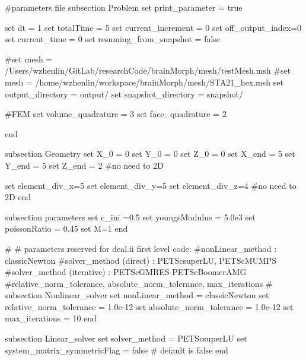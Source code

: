 \begin{DoxyCode}
\textcolor{preprocessor}{#parameters file}
\textcolor{preprocessor}{}
subsection Problem
set print\_parameter = \textcolor{keyword}{true}

set dt = 1
set totalTime = 5
set current\_increment = 0
set off\_output\_index=0
set current\_time = 0
set resuming\_from\_snapshot = \textcolor{keyword}{false}

\textcolor{preprocessor}{#set mesh = /Users/wzhenlin/GitLab/researchCode/brainMorph/mesh/testMesh.msh}
\textcolor{preprocessor}{}\textcolor{preprocessor}{#set mesh = /home/wzhenlin/workspace/brainMorph/mesh/STA21\_hex.msh}
\textcolor{preprocessor}{}set output\_directory = output/
set snapshot\_directory = snapshot/

\textcolor{preprocessor}{#FEM}
\textcolor{preprocessor}{}set volume\_quadrature = 3 
set face\_quadrature = 2 

end

subsection Geometry
set X\_0 = 0
set Y\_0 = 0
set Z\_0 = 0
set X\_end = 5 
set Y\_end = 5
set Z\_end = 2 #no need to 2D

set element\_div\_x=5
set element\_div\_y=5
set element\_div\_z=4 #no need to 2D
end

subsection parameters
set c\_ini =0.5
set youngsModulus =  5.0e3
set poissonRatio =  0.45
set M=1 
end
                        
\textcolor{preprocessor}{#}
\textcolor{preprocessor}{}\textcolor{preprocessor}{# parameters reserved for deal.ii first level code:}
\textcolor{preprocessor}{}\textcolor{preprocessor}{#nonLinear\_method : classicNewton}
\textcolor{preprocessor}{}\textcolor{preprocessor}{#solver\_method (direct) : PETScsuperLU, PETScMUMPS}
\textcolor{preprocessor}{}\textcolor{preprocessor}{#solver\_method (iterative) : PETScGMRES PETScBoomerAMG}
\textcolor{preprocessor}{}\textcolor{preprocessor}{#relative\_norm\_tolerance, absolute\_norm\_tolerance, max\_iterations}
\textcolor{preprocessor}{}\textcolor{preprocessor}{#}
\textcolor{preprocessor}{}subsection Nonlinear\_solver
        set nonLinear\_method = classicNewton
        set relative\_norm\_tolerance = 1.0e-12
        set absolute\_norm\_tolerance = 1.0e-12
        set max\_iterations = 10
end
                        
subsection Linear\_solver
        set solver\_method = PETScsuperLU
        set system\_matrix\_symmetricFlag = \textcolor{keyword}{false} # \textcolor{keywordflow}{default} is \textcolor{keyword}{false}
end
\end{DoxyCode}
 